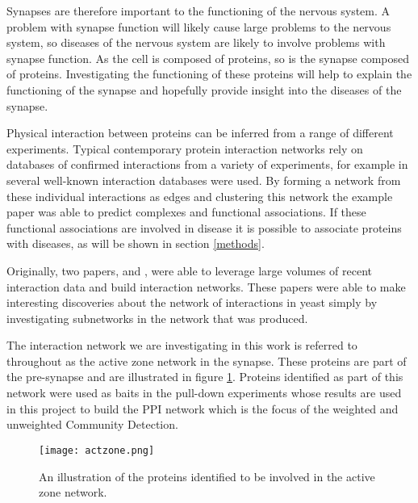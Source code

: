 Synapses are therefore important to the functioning of the nervous system.
A problem with synapse function will likely cause large problems to the nervous system, so diseases of the nervous system are likely to involve problems with synapse function.
As the cell is composed of proteins, so is the synapse composed of proteins.
Investigating the functioning of these proteins will help to explain the functioning of the synapse and hopefully provide insight into the diseases of the synapse.

Physical interaction between proteins can be inferred from a range of different experiments.
Typical contemporary protein interaction networks rely on databases of confirmed interactions from a variety of experiments, for example in \textcite{kenley_detecting_2011} several well-known interaction databases were used.
By forming a network from these individual interactions as edges and clustering this network the example paper was able to predict complexes and functional associations.
If these functional associations are involved in disease it is possible to associate proteins with diseases, as will be shown in section \ref{methods}.

Originally, two papers, \textcite{ito_comprehensive_2001} and \textcite{uetz_comprehensive_2000}, were able to leverage large volumes of recent interaction data and build interaction networks.
These papers were able to make interesting discoveries about the network of interactions in yeast simply by investigating subnetworks in the network that was produced.

The interaction network we are investigating in this work is referred to throughout as the active zone network in the synapse.
These proteins are part of the pre-synapse and are illustrated in figure \ref{fig:actzone}.
Proteins identified as part of this network were used as baits in the pull-down experiments whose results are used in this project to build the PPI network which is the focus of the weighted and unweighted Community Detection.

\begin{figure}
    \centering
    \texttt{[image: actzone.png]}
    \caption{An illustration of the proteins identified to be involved in the active zone network\autocite{chua_architecture_2010}.}
    \label{fig:actzone}
\end{figure}


